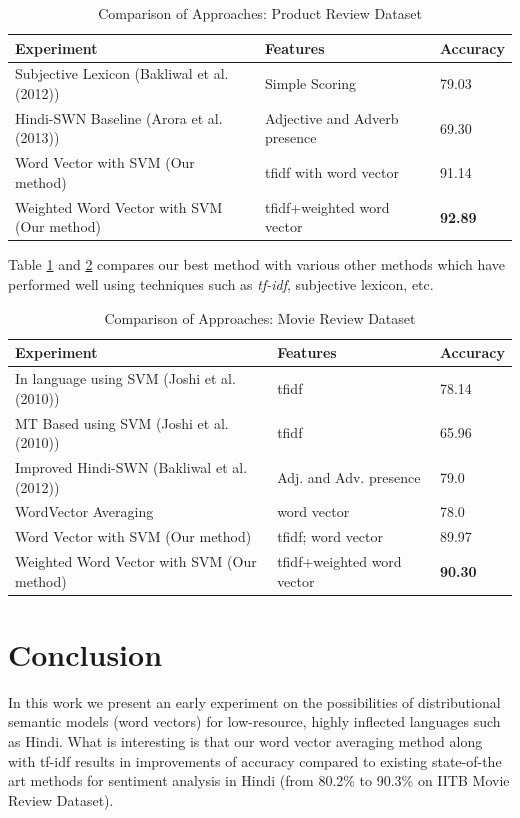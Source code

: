 \documentclass[11pt,a4paper]{article}
\begin{document}
\begin {table}[h!]
\centering
\small
\begin{tabular}{ | p{3.5cm} | p{1.5cm} | p{1.5cm} | }
\hline
\textbf{Experiment} & \textbf{Features} & \textbf{Accuracy} \\ \hline
Subjective Lexicon (Bakliwal et al.(2012)) & Simple Scoring & 79.03\\ \hline
Hindi-SWN Baseline (Arora et al.(2013)) & Adjective and Adverb presence & 69.30\\ \hline
Word Vector with SVM (Our method) & tfidf with word vector & 91.14\\ \hline
Weighted Word Vector with SVM (Our method) & tfidf+weighted word vector & \textbf{92.89}\\ \hline
\end{tabular}
\caption {Comparison of Approaches: Product Review Dataset}
\label{table:hindi_product}
\end{table}
Table \ref{table:hindi_product} and \ref{table:hindi_movie} compares our best method with various other methods which have performed well using techniques such as \emph{tf-idf}, subjective lexicon, etc.

\begin {table}[h!]
\centering
\small
\begin{tabular}{ | p{3.5cm} | p{1.5cm} | p{1.5cm} | }
\hline
\textbf{Experiment} & \textbf{Features} & \textbf{Accuracy} \\ \hline
In language using SVM (Joshi et al.(2010)) & tfidf & 78.14\\ \hline
MT Based using SVM (Joshi et al.(2010)) & tfidf & 65.96\\ \hline
Improved Hindi-SWN  (Bakliwal et al.(2012)) & Adj. and Adv. presence & 79.0\\ \hline
WordVector Averaging & word vector & 78.0\\ \hline
Word Vector with SVM (Our method) & tfidf; word vector & 89.97\\ \hline
Weighted Word Vector with SVM (Our method) & tfidf+weighted word vector & \textbf{90.30}\\ \hline
\end{tabular}
\caption {Comparison of Approaches: Movie Review Dataset}
\label{table:hindi_movie}
\end{table}

\section{Conclusion}
\label{sec:conclusion}
In this work we present an early experiment on the possibilities of distributional semantic models (word vectors) for low-resource, highly inflected languages such as Hindi.  What is interesting is that our word vector averaging method along with tf-idf results in improvements of accuracy compared to existing state-of-the art methods for sentiment analysis in Hindi (from 80.2\% to 90.3\% on IITB Movie Review Dataset).
\end{document}
